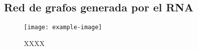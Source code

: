 \subsection{Red de grafos generada por el RNA}

 \lipsum[1]

\begin{figure}[H]
	\centering
	\texttt{[image: example-image]}
	\centering\caption{XXXX}
\end{figure}

\lipsum[1]